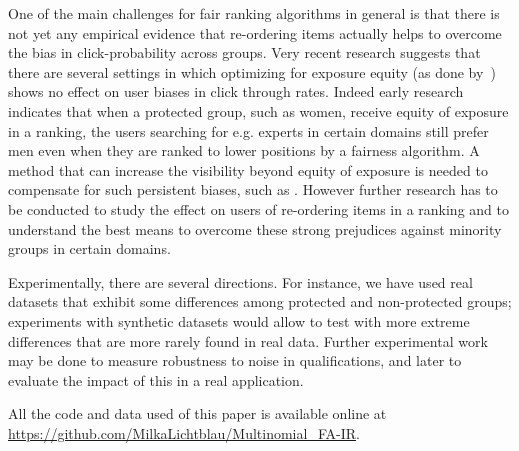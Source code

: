 One of the main challenges for fair ranking algorithms in general is that there is not yet any empirical evidence that re-ordering items actually helps to overcome the bias in click-probability across groups.
%
Very recent research  suggests that there are several settings in which optimizing for exposure equity (as done by~\cite{biega2018equity, singh2019policy}) shows no effect on user biases in click through rates. 
%
Indeed early research indicates that when a protected group, such as women, receive equity of exposure in a ranking, the users searching for e.g. experts in certain domains still prefer men even when they are ranked to lower positions by a fairness algorithm.
%
A method that can increase the visibility beyond equity of exposure is needed to compensate for such persistent biases, such as \algoFAIR.
%
However further research has to be conducted to study the effect on users of re-ordering items in a ranking and to understand the best means to overcome these strong prejudices against minority groups in certain domains.

Experimentally, there are several directions. For instance, we have used real datasets that exhibit some differences among protected and non-protected groups; experiments with synthetic datasets would allow to test with more extreme differences that are more rarely found in real data.
%
Further experimental work may be done to measure robustness to noise in qualifications, and later to evaluate the impact of this in a real application.

All the code and data used of this paper is available online at \url{https://github.com/MilkaLichtblau/Multinomial_FA-IR}.
